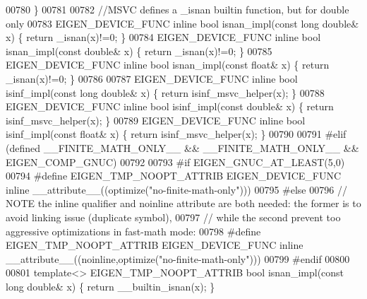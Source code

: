 \begin{DoxyCode}
00780 \}
00781 
00782 \textcolor{comment}{//MSVC defines a \_isnan builtin function, but for double only}
00783 EIGEN\_DEVICE\_FUNC \textcolor{keyword}{inline} \textcolor{keywordtype}{bool} isnan\_impl(\textcolor{keyword}{const} \textcolor{keywordtype}{long} \textcolor{keywordtype}{double}& x) \{ \textcolor{keywordflow}{return} \_isnan(x)!=0; \}
00784 EIGEN\_DEVICE\_FUNC \textcolor{keyword}{inline} \textcolor{keywordtype}{bool} isnan\_impl(\textcolor{keyword}{const} \textcolor{keywordtype}{double}& x)      \{ \textcolor{keywordflow}{return} \_isnan(x)!=0; \}
00785 EIGEN\_DEVICE\_FUNC \textcolor{keyword}{inline} \textcolor{keywordtype}{bool} isnan\_impl(\textcolor{keyword}{const} \textcolor{keywordtype}{float}& x)       \{ \textcolor{keywordflow}{return} \_isnan(x)!=0; \}
00786 
00787 EIGEN\_DEVICE\_FUNC \textcolor{keyword}{inline} \textcolor{keywordtype}{bool} isinf\_impl(\textcolor{keyword}{const} \textcolor{keywordtype}{long} \textcolor{keywordtype}{double}& x) \{ \textcolor{keywordflow}{return} isinf\_msvc\_helper(x); \}
00788 EIGEN\_DEVICE\_FUNC \textcolor{keyword}{inline} \textcolor{keywordtype}{bool} isinf\_impl(\textcolor{keyword}{const} \textcolor{keywordtype}{double}& x)      \{ \textcolor{keywordflow}{return} isinf\_msvc\_helper(x); \}
00789 EIGEN\_DEVICE\_FUNC \textcolor{keyword}{inline} \textcolor{keywordtype}{bool} isinf\_impl(\textcolor{keyword}{const} \textcolor{keywordtype}{float}& x)       \{ \textcolor{keywordflow}{return} isinf\_msvc\_helper(x); \}
00790 
00791 \textcolor{preprocessor}{#elif (defined \_\_FINITE\_MATH\_ONLY\_\_ && \_\_FINITE\_MATH\_ONLY\_\_ && EIGEN\_COMP\_GNUC)}
00792 
00793 \textcolor{preprocessor}{#if EIGEN\_GNUC\_AT\_LEAST(5,0)}
00794 \textcolor{preprocessor}{  #define EIGEN\_TMP\_NOOPT\_ATTRIB EIGEN\_DEVICE\_FUNC inline \_\_attribute\_\_((optimize("no-finite-math-only")))}
00795 \textcolor{preprocessor}{#else}
00796   \textcolor{comment}{// NOTE the inline qualifier and noinline attribute are both needed: the former is to avoid linking issue
       (duplicate symbol),}
00797   \textcolor{comment}{//      while the second prevent too aggressive optimizations in fast-math mode:}
00798 \textcolor{preprocessor}{  #define EIGEN\_TMP\_NOOPT\_ATTRIB EIGEN\_DEVICE\_FUNC inline
       \_\_attribute\_\_((noinline,optimize("no-finite-math-only")))}
00799 \textcolor{preprocessor}{#endif}
00800 
00801 \textcolor{keyword}{template}<> EIGEN\_TMP\_NOOPT\_ATTRIB \textcolor{keywordtype}{bool} isnan\_impl(\textcolor{keyword}{const} \textcolor{keywordtype}{long} \textcolor{keywordtype}{double}& x) \{ \textcolor{keywordflow}{return} \_\_builtin\_isnan(x); \}

\end{DoxyCode}

